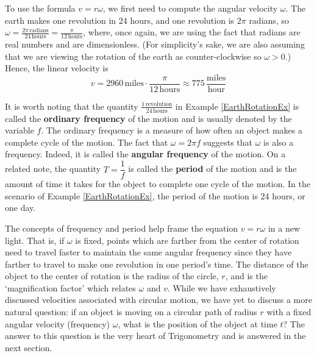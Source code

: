 \medskip

{  To use the formula $v = r \omega$, we first need to compute the angular velocity $\omega$.  The earth makes one revolution in 24 hours, and one revolution is $2 \pi$ radians, so $\omega = \frac{2 \pi \, \text{radians}}{24 \, \text{hours}} = \frac{\pi}{12 \, \text{hours}}$, where, once again, we are using the fact that radians are real numbers and are dimensionless. (For simplicity's sake, we are also assuming that we are viewing the rotation of the earth as counter-clockwise so $\omega > 0$.)  Hence, the linear velocity is \[ v = 2960 \, \text{miles} \cdot \frac{\pi}{12 \, \text{hours}} \approx 775 \, \frac{\text{miles}}{\text{hour}}\] }

\medskip

It is worth noting that the quantity $\frac{1 \, \text{revolution}}{24 \, \text{hours}}$ in Example \ref{EarthRotationEx} is called the   \textbf{ordinary frequency} of the motion and is usually denoted by the variable $f$.  The ordinary frequency is a measure of how often an object makes a complete cycle of the motion.  The fact that $\omega = 2\pi f$ suggests that $\omega$ is also a frequency.  Indeed, it is called the   \textbf{angular frequency} of the motion.  On a related note, the quantity $T = \dfrac{1}{f}$ is called the \textbf{period} of the motion and is the amount of time it takes for the object to complete one cycle of the motion.  In the scenario of Example \ref{EarthRotationEx}, the period of the motion is 24 hours, or one day.  

\smallskip

The concepts of frequency and period help frame the equation $v = r \omega$ in a new light.  That is, if $\omega$ is fixed, points which are farther from the center of rotation need to travel faster to maintain the same angular frequency since they have farther to travel to make one revolution in one period's time.  The distance of the object to the center of rotation is the radius of the circle, $r$, and is the `magnification factor' which relates $\omega$ and $v$.   While we have exhaustively discussed velocities associated with circular motion, we have yet to discuss a more natural question: if an object is moving on a circular path of radius $r$ with a fixed angular velocity (frequency) $\omega$, what is the position of the object at time $t$?  The answer to this question is the very heart of Trigonometry and is answered in the next section.





